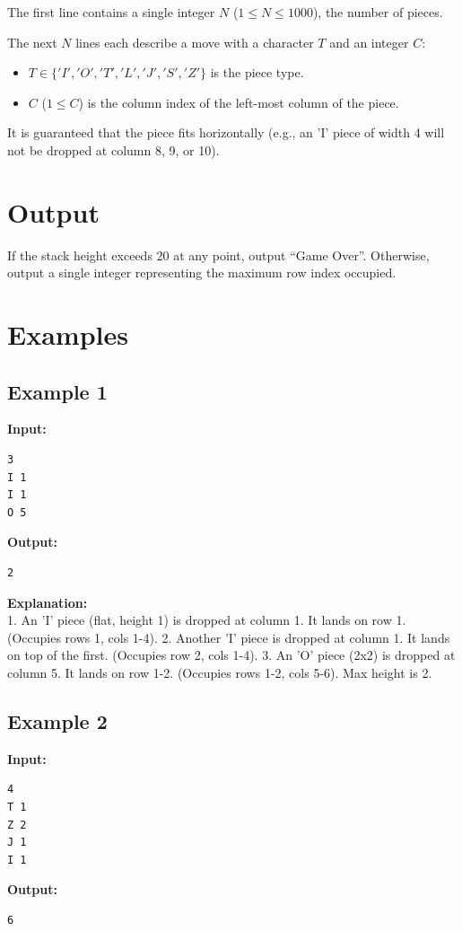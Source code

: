 \documentclass[11pt, letterpaper]{article}
\begin{document}
The first line contains a single integer $N$ ($1 \le N \le 1000$), the number of pieces.

The next $N$ lines each describe a move with a character $T$ and an integer $C$:
\begin{itemize}
    \item $T \in \{'I', 'O', 'T', 'L', 'J', 'S', 'Z'\}$ is the piece type.
    \item $C$ ($1 \le C$) is the column index of the left-most column of the piece.
\end{itemize}
It is guaranteed that the piece fits horizontally (e.g., an 'I' piece of width 4 will not be dropped at column 8, 9, or 10).

\section*{Output}

If the stack height exceeds 20 at any point, output ``Game Over''.
Otherwise, output a single integer representing the maximum row index occupied.

\section*{Examples}

\subsection*{Example 1}
\textbf{Input:}
\begin{verbatim}
3
I 1
I 1
O 5
\end{verbatim}

\textbf{Output:}
\begin{verbatim}
2
\end{verbatim}

\textbf{Explanation:} \\
1. An 'I' piece (flat, height 1) is dropped at column 1. It lands on row 1. (Occupies rows 1, cols 1-4).
2. Another 'I' piece is dropped at column 1. It lands on top of the first. (Occupies row 2, cols 1-4).
3. An 'O' piece (2x2) is dropped at column 5. It lands on row 1-2. (Occupies rows 1-2, cols 5-6).
Max height is 2.

\subsection*{Example 2}
\textbf{Input:}
\begin{verbatim}
4
T 1
Z 2
J 1
I 1
\end{verbatim}

\textbf{Output:}
\begin{verbatim}
6
\end{verbatim}
\end{document}
